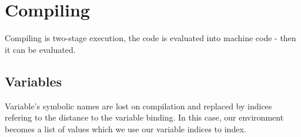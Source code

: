 \section{Compiling}

Compiling is two-stage execution, the code is evaluated
into machine code - then it can be evaluated.

\subsection{Variables}

Variable's symbolic names are lost on compilation and 
replaced by indices refering to the distance to the variable
binding. In this case, our environment becomes a list of values
which we use our variable indices to index.
